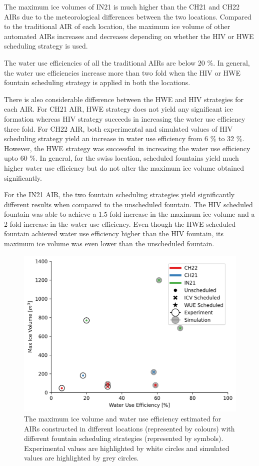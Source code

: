 \documentclass[tc, manuscript]{copernicus}
\begin{document}
The maximum ice volumes of IN21 is much higher than the CH21 and CH22 AIRs due to the meteorological differences
between the two locations. Compared to the traditional AIR of each location, the maximum ice volume of other
automated AIRs increases and decreases depending on whether the HIV or HWE scheduling strategy is used. 

The water use efficiencies of all the traditional AIRs are below 20 \%. In general, the water use efficiencies
increase more than two fold when the HIV or HWE fountain scheduling strategy is applied in both the locations.  

There is also considerable difference between the HWE and HIV strategies for each AIR. For CH21 AIR, HWE
strategy does not yield any significant ice formation whereas HIV strategy succeeds in increasing the water use
efficiency three fold. For CH22 AIR, both experimental and simulated values of HIV scheduling strategy yield an
increase in water use efficiency from 6 \% to 32 \%. However, the HWE strategy was successful in increasing the
water use efficiency upto 60 \%. In general, for the swiss location, scheduled fountains yield much higher water
use efficiency but do not alter the maximum ice volume obtained significantly.

For the IN21 AIR, the two fountain scheduling strategies yield significantly different results when compared
to the unscheduled fountain. The HIV scheduled fountain was able to achieve a 1.5 fold increase in the maximum
ice volume and a 2 fold increase in the water use efficiency. Even though the HWE scheduled fountain achieved
water use efficiency higher than the HIV fountain, its maximum ice volume was even lower than the unscheduled
fountain.

\begin{figure}[t]
\includegraphics[width=12cm]{Figures/wue.png}

\caption{The maximum ice volume and water use efficiency estimated for AIRs constructed in different locations
(represented by colours) with different fountain scheduling strategies (represented by symbols). Experimental
values are highlighted by white circles and simulated values are highlighted by grey circles.  }

\label{fig:wue}
\end{figure}
\end{document}
